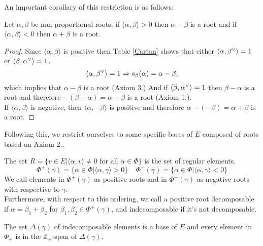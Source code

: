 An important corollary of this restriction is as follows:
\begin{corol}
	Let $\alpha,\beta$ be non-proportional roots, if $\langle \alpha,\beta \rangle > 0$ then $\alpha-\beta$ is a root and if $\langle \alpha,\beta \rangle <0$ then $\alpha+\beta$ is a root.
	\label{corolcartan}
\end{corol}
\begin{proof}
	Since $\langle \alpha, \beta \rangle$ is positive then Table \ref{Cartan} shows that either $\langle {\alpha},{\beta}^\lor\rangle=1$ or $\langle {\beta},{\alpha}^\lor\rangle=1$.\\
	$$\langle {\alpha},{\beta}^\lor\rangle=1 \Rightarrow s_\beta(\alpha) = \alpha - \beta,$$
	which implies that $\alpha-\beta$ is a root (Axiom 3.)
	And if $\langle {\beta},{\alpha}^\lor\rangle=1$ then $\beta-\alpha$ is a root and therefore $-(\beta-\alpha)=\alpha-\beta$ is a root (Axiom 1.).\\
	If $\langle \alpha,\beta \rangle$ is negative, then $\langle \alpha,-\beta \rangle $ is positive and therefore $\alpha-(-\beta) = \alpha+\beta$ is a root.
\end{proof}
Following this, we restrict ourselves to some specific bases of $E$ composed of roots based on Axiom $2.$.
\begin{defi}
	The set $R=\{v \in E| \langle \alpha,v \rangle \not=0 \text{ for all } \alpha \in \Phi\}$ is the set of regular elements.\\
	$$\Phi^+(\gamma) = \{\alpha \in \Phi | \langle\alpha, \gamma\rangle>0 \}\ \ \ \ \ \Phi^-(\gamma) = \{\alpha \in \Phi|\langle \alpha,\gamma \rangle < 0\}$$
	We call elements in $\Phi^+(\gamma)$ as positive roots and in $\Phi^-(\gamma)$ as negative roots with respective to $\gamma$.\\
	Furthermore, with respect to this ordering, we call a positive root decomposable if $\alpha=\beta_1+\beta_2$ for $\beta_1,\beta_2 \in \Phi^+(\gamma)$, and indecomposable if it's not decomposable.
\end{defi}
\begin{teo}
	The set $\Delta(\gamma)$ of indecomposable elements is a base of $E$ and every element in $\Phi_+$ is in the $\mathbb{Z}_+$-span of $\Delta(\gamma)$.
	\label{basetheo}
\end{teo}
